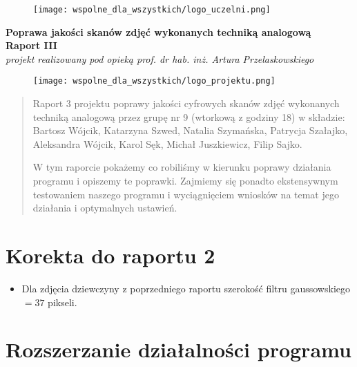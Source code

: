 \documentclass[]{mwart}
\begin{document}
\thispagestyle{empty}

\begin{figure}[h]
    \centering
    \texttt{[image: wspolne\_dla\_wszystkich/logo\_uczelni.png]}
\end{figure}


\begin{center}
    {\LARGE \textbf{Poprawa jakości skanów zdjęć wykonanych techniką analogową
        }} \\[0.3cm]
    {\large \textbf{Raport III}} \\[0.2cm]
    \textit{projekt realizowany pod opieką prof. dr hab. inż. Artura Przelaskowskiego}

\end{center}

\begin{figure}[h]
    \centering
    \texttt{[image: wspolne\_dla\_wszystkich/logo\_projektu.png]}
\end{figure}

\vfill
\begin{abstract}
    Raport 3 projektu poprawy jakości cyfrowych skanów zdjęć wykonanych techniką analogową przez grupę nr 9 (wtorkową z godziny 18)
    w składzie:  Bartosz Wójcik, Katarzyna Szwed, Natalia Szymańska,
    Patrycja Szałajko, Aleksandra Wójcik, Karol Sęk, Michał Juszkiewicz, Filip Sajko.

    W tym raporcie pokażemy co robiliśmy w kierunku poprawy działania programu i opiszemy te poprawki.
    Zajmiemy się ponadto ekstensywnym testowaniem naszego programu i wyciągnięciem wniosków na temat jego działania i optymalnych ustawień.
\end{abstract}

\newpage
\tableofcontents{}

\newpage

\section{Korekta do raportu 2}
\begin{itemize}
    \item Dla zdjęcia dziewczyny z poprzedniego raportu szerokość filtru gaussowskiego $ =  37$ pikseli.
\end{itemize}


\section{Rozszerzanie działalności programu}
\end{document}
